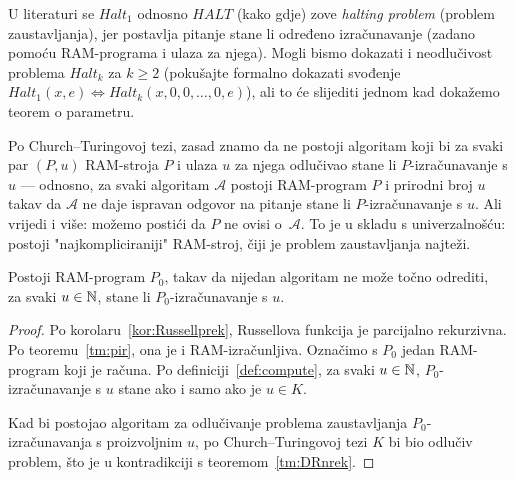 U literaturi se $Halt_1$ odnosno $HALT$ (kako gdje) zove \emph{halting problem} (problem zaustavljanja), jer postavlja pitanje stane li određeno izračunavanje (zadano pomoću RAM-programa i ulaza za njega). Mogli bismo dokazati i neodlučivost problema $Halt_k$ za $k\ge 2$ (pokušajte formalno dokazati svođenje $Halt_1(x,e)\Leftrightarrow Halt_k(x,0,0,\dotsc,0,e)$), ali to će slijediti jednom kad dokažemo teorem o parametru.

Po Church--\!Turingovoj tezi, zasad znamo da ne postoji algoritam koji bi za svaki par $(P,u)$ RAM-stroja $P$ i ulaza $u$ za njega odlučivao stane li $P$-izračunavanje s $u$ --- odnosno, za svaki algoritam $\mathcal A$ postoji RAM-program $P$ i prirodni broj $u$ takav da $\mathcal A$ ne daje ispravan odgovor na pitanje stane li $P$-izračunavanje s $u$. Ali vrijedi i više: možemo postići da $P$ ne ovisi o~$\mathcal A$. To je u skladu s univerzalnošću: postoji "najkompliciraniji" RAM-stroj, čiji je problem zaustavljanja najteži.

\begin{korolar}[{name=[neodlučivost problema zaustavljanja za jedan fiksni RAM-stroj]}]\label{kor:RAMhaltnodl}
Postoji RAM-program $P_0$, takav da nijedan algoritam ne može točno odrediti,\\ za svaki $u\in{\mathbb N}$, stane li $P_0$-izračunavanje s $u$.
\end{korolar}
\begin{proof}
Po korolaru~\ref{kor:Russellprek}, Russellova funkcija je parcijalno rekurzivna. Po teoremu~\ref{tm:pir}, ona je i RAM-izračunljiva. Označimo s $P_0$ jedan RAM-program koji je računa. Po definiciji~\ref{def:compute}, za svaki $u\in{\mathbb N}$, $P_0$-izračunavanje s $u$ stane ako i samo ako je $u\in K$.

Kad bi postojao algoritam za odlučivanje problema zaustavljanja $P_0$-izračunavanja s proizvoljnim $u$, po Church--\!Turingovoj tezi $K$ bi bio odlučiv problem, što je u kontradikciji s teoremom~\ref{tm:DRnrek}.
\end{proof}

